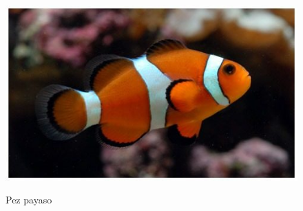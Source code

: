 \begin{figure}[h!]
	\centering
    \includegraphics[width=.9\textwidth]{./Figures/nemo.jpg}
	\label{fig:nemo}
	\caption{Pez payaso}
\end{figure}


%








